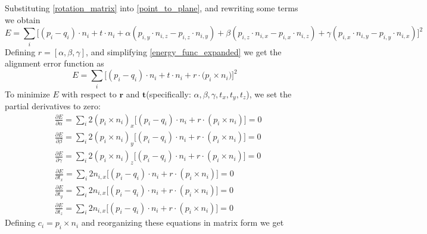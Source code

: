 \documentclass[12pt]{article}
\begin{document}
Substituting \eqref{rotation_matrix} into \eqref{point_to_plane}, and rewriting some terms we obtain
\begin{equation}\label{energy_func_expanded}
E = \sum_{i}{}\big[(p_i-q_i)\cdot n_i +t\cdot n_i+\alpha(p_{i,y}\cdot n_{i,z}-p_{i,z}\cdot n_{i,y})+\beta(p_{i,z}\cdot n_{i,x}-p_{i,x}\cdot n_{i,z})+\gamma(p_{i,x}\cdot n_{i,y}-p_{i,y}\cdot n_{i,x})]^2
\end{equation}
Defining $r=[\alpha,\beta,\gamma]$, and simplifying \eqref{energy_func_expanded} we get the alignment error function as
$$E = \sum_{i}{}\big[(p_i-q_i)\cdot n_i+t\cdot n_i+r\cdot (p_i\times n_i\big)]^2$$
To minimize $E$ with respect to $\mathbf{r}$ and $\mathbf{t}$(specifically: $\alpha,\beta,\gamma,t_x,t_y,t_z$), we set the partial derivatives to zero:
\begin{equation}
    \begin{split}
        &\frac{\partial E}{\partial \alpha} = \sum_{i}{}2(p_i\times n_i)_x\big[(p_i-q_i)\cdot n_i+r\cdot (p_i\times n_i)\big] = 0\\
        &\frac{\partial E}{\partial \beta} = \sum_{i}{}2(p_i\times n_i)_y\big[(p_i-q_i)\cdot n_i+r\cdot (p_i\times n_i)\big] = 0\\
        &\frac{\partial E}{\partial \gamma} = \sum_{i}{}2(p_i\times n_i)_z\big[(p_i-q_i)\cdot n_i+r\cdot (p_i\times n_i)\big] = 0\\
        &\frac{\partial E}{\partial t_x} = \sum_{i}{}2n_{i,x}\big[(p_i-q_i)\cdot n_i+r\cdot (p_i\times n_i)\big] = 0\\
        &\frac{\partial E}{\partial t_y} = \sum_{i}{}2n_{i,x}\big[(p_i-q_i)\cdot n_i+r\cdot (p_i\times n_i)\big] = 0\\
        &\frac{\partial E}{\partial t_z} = \sum_{i}{}2n_{i,x}\big[(p_i-q_i)\cdot n_i+r\cdot (p_i\times n_i)\big] = 0
    \end{split}
\end{equation}
Defining $c_i=p_i\times n_i$ and reorganizing these equations in matrix form we get
\end{document}
